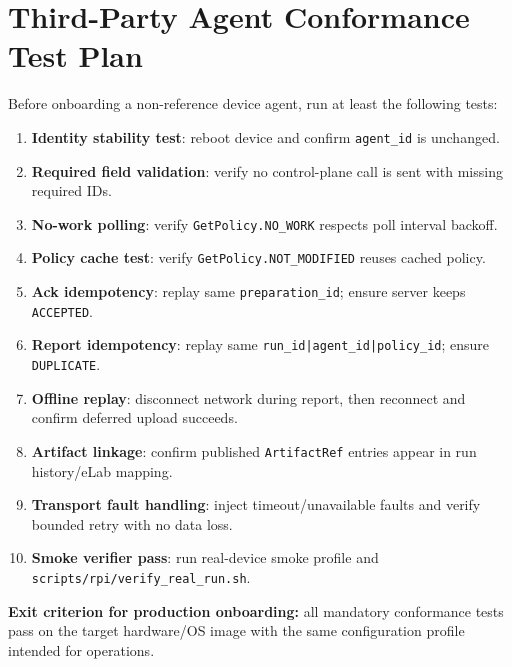 \documentclass[11pt,a4paper]{article}
\begin{document}
\section{Third-Party Agent Conformance Test Plan}
Before onboarding a non-reference device agent, run at least the following tests:
\begin{enumerate}
  \item \textbf{Identity stability test}: reboot device and confirm \texttt{agent\_id} is unchanged.
  \item \textbf{Required field validation}: verify no control-plane call is sent with missing required IDs.
  \item \textbf{No-work polling}: verify \texttt{GetPolicy.NO\_WORK} respects poll interval backoff.
  \item \textbf{Policy cache test}: verify \texttt{GetPolicy.NOT\_MODIFIED} reuses cached policy.
  \item \textbf{Ack idempotency}: replay same \texttt{preparation\_id}; ensure server keeps \texttt{ACCEPTED}.
  \item \textbf{Report idempotency}: replay same \texttt{run\_id|agent\_id|policy\_id}; ensure \texttt{DUPLICATE}.
  \item \textbf{Offline replay}: disconnect network during report, then reconnect and confirm deferred upload succeeds.
  \item \textbf{Artifact linkage}: confirm published \texttt{ArtifactRef} entries appear in run history/eLab mapping.
  \item \textbf{Transport fault handling}: inject timeout/unavailable faults and verify bounded retry with no data loss.
  \item \textbf{Smoke verifier pass}: run real-device smoke profile and \texttt{scripts/rpi/verify\_real\_run.sh}.
\end{enumerate}

\textbf{Exit criterion for production onboarding:}
all mandatory conformance tests pass on the target hardware/OS image with the same configuration profile intended for operations.
\end{document}
